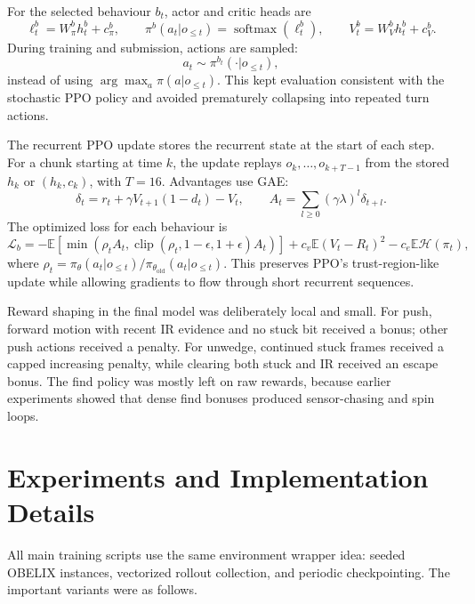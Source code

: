\documentclass[11pt, oneside]{article}
\begin{document}
For the selected behaviour \(b_t\), actor and critic heads are
\[
\ell_t^b=W_\pi^b h_t^b+c_\pi^b,\qquad
\pi^b(a_t|o_{\le t})=\operatorname{softmax}(\ell_t^b),\qquad
V^b_t=W_V^b h_t^b+c_V^b.
\]
During training and submission, actions are sampled:
\[
a_t\sim \pi^{b_t}(\cdot|o_{\le t}),
\]
instead of using \(\arg\max_a \pi(a|o_{\le t})\). This kept evaluation consistent with the stochastic PPO policy and avoided prematurely collapsing into repeated turn actions.

The recurrent PPO update stores the recurrent state at the start of each step. For a chunk starting at time \(k\), the update replays \(o_k,\ldots,o_{k+T-1}\) from the stored \(h_k\) or \((h_k,c_k)\), with \(T=16\). Advantages use GAE:
\[
\delta_t=r_t+\gamma V_{t+1}(1-d_t)-V_t,\qquad
A_t=\sum_{l\ge 0}(\gamma\lambda)^l\delta_{t+l}.
\]
The optimized loss for each behaviour is
\[
\mathcal{L}_b
=-\mathbb{E}\left[\min(\rho_t A_t,\operatorname{clip}(\rho_t,1-\epsilon,1+\epsilon)A_t)\right]
+c_v\mathbb{E}(V_t-R_t)^2-c_e\mathbb{E}\mathcal{H}(\pi_t),
\]
where \(\rho_t=\pi_\theta(a_t|o_{\le t})/\pi_{\theta_{\mathrm{old}}}(a_t|o_{\le t})\). This preserves PPO's trust-region-like update while allowing gradients to flow through short recurrent sequences.

Reward shaping in the final model was deliberately local and small. For push, forward motion with recent IR evidence and no stuck bit received a bonus; other push actions received a penalty. For unwedge, continued stuck frames received a capped increasing penalty, while clearing both stuck and IR received an escape bonus. The find policy was mostly left on raw rewards, because earlier experiments showed that dense find bonuses produced sensor-chasing and spin loops.

\section{Experiments and Implementation Details}
All main training scripts use the same environment wrapper idea: seeded OBELIX instances, vectorized rollout collection, and periodic checkpointing. The important variants were as follows.
\end{document}
